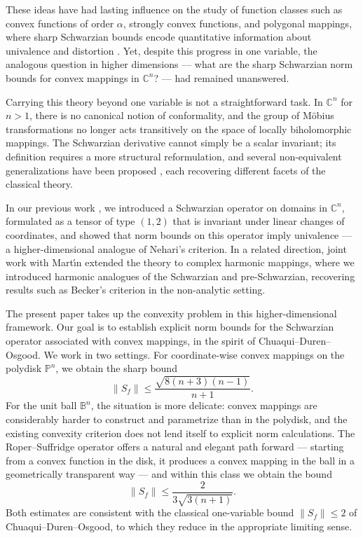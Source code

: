\documentclass[12pt]{amsart}
\theoremstyle{definition}
\theoremstyle{remark}
\numberwithin{equation}{section}
\begin{document}
These ideas have had lasting influence on the study of function classes such
as convex functions of order $\alpha$, strongly convex functions, and
polygonal mappings, where sharp Schwarzian bounds encode quantitative
information about univalence and distortion \cite{kanas2011}. Yet, despite
this progress in one variable, the analogous question in higher dimensions ---
what are the sharp Schwarzian norm bounds for convex mappings in
$\mathbb{C}^n$? --- had remained unanswered.

Carrying this theory beyond one variable is not a straightforward task. In
$\mathbb{C}^n$ for $n > 1$, there is no canonical notion of conformality, and
the group of M\"{o}bius transformations no longer acts transitively on the
space of locally biholomorphic mappings. The Schwarzian derivative cannot
simply be a scalar invariant; its definition requires a more structural
reformulation, and several non-equivalent generalizations have been proposed
\cite{MM1, MM2, MT}, each recovering different facets of the classical theory.

In our previous work \cite{He, hernandez2007}, we introduced a Schwarzian
operator on domains in $\mathbb{C}^n$, formulated as a tensor of type $(1,2)$
that is invariant under linear changes of coordinates, and showed that norm
bounds on this operator imply univalence --- a higher-dimensional analogue of
Nehari's criterion. In a related direction, joint work with
Mart\'{\i}n \cite{hernandezmartin2013} extended the theory to complex harmonic
mappings, where we introduced harmonic analogues of the Schwarzian and
pre-Schwarzian, recovering results such as Becker's criterion in the
non-analytic setting.

The present paper takes up the convexity problem in this higher-dimensional
framework. Our goal is to establish explicit norm bounds for the Schwarzian
operator associated with convex mappings, in the spirit of
Chuaqui--Duren--Osgood. We work in two settings. For coordinate-wise convex
mappings on the polydisk $\mathbb{P}^n$, we obtain the sharp bound
\[
\|S_f\| \leq \frac{\sqrt{8(n+3)(n-1)}}{n+1}.
\]
For the unit ball $\mathbb{B}^n$, the situation is more delicate: convex
mappings are considerably harder to construct and parametrize than in the
polydisk, and the existing convexity criterion does not lend itself to explicit
norm calculations. The Roper--Suffridge operator offers a natural and elegant
path forward --- starting from a convex function in the disk, it produces a
convex mapping in the ball in a geometrically transparent way --- and within
this class we obtain the bound
\[
\|S_f\| \leq \frac{2}{3\sqrt{3(n+1)}}.
\]
Both estimates are consistent with the classical one-variable bound
$\|S_f\| \leq 2$ of Chuaqui--Duren--Osgood, to which they reduce in the
appropriate limiting sense.
\end{document}
